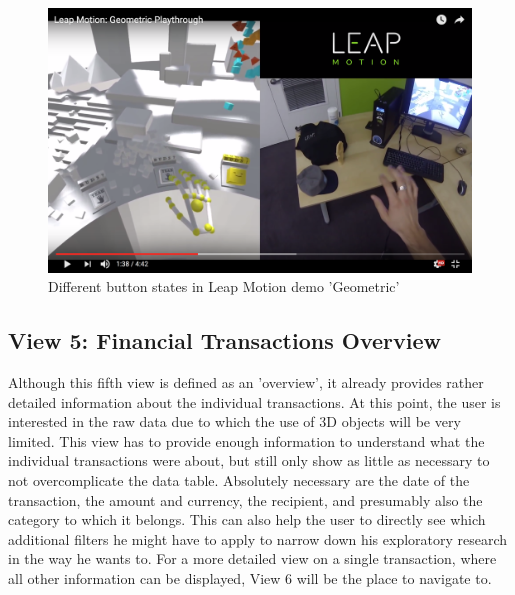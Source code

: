 \begin{figure}[h]
	\begin{center}
		\includegraphics[width=14cm]{03_Figures/07_Suggestion/LeapMotion2016_Geometric.png}
		\caption[Different button states in Leap Motion demo 'Geometric']{Different button states in Leap Motion demo 'Geometric' \citep{LeapMotion2016}}
		\label{fig:leapmotiongeometric}
	\end{center}
\end{figure}



\subsection{View 5: Financial Transactions Overview}

Although this fifth view is defined as an 'overview', it already provides rather detailed information about the individual transactions. At this point, the user is interested in the raw data due to which the use of 3D objects will be very limited. This view has to provide enough information to understand what the individual transactions were about, but still only show as little as necessary to not overcomplicate the data table. Absolutely necessary are the date of the transaction, the amount and currency, the recipient, and presumably also the category to which it belongs. This can also help the user to directly see which additional filters he might have to apply to narrow down his exploratory research in the way he wants to. For a more detailed view on a single transaction, where all other information can be displayed, View 6 will be the place to navigate to.


